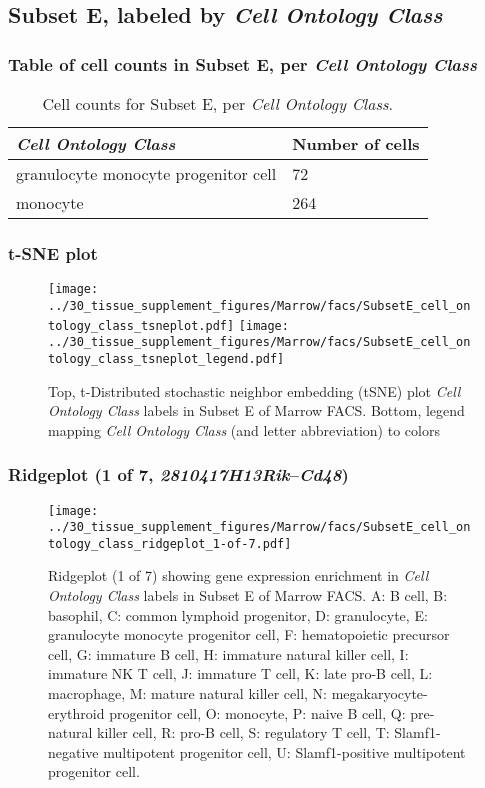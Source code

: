 \clearpage

\subsection{Subset E, labeled by \emph{Cell Ontology Class}}
\subsubsection{Table of cell counts in Subset E, per \emph{Cell Ontology Class}}\begin{table}[h]
\centering
\label{my-label}
\begin{tabular}{@{}ll@{}}
\toprule

\emph{Cell Ontology Class}& Number of cells \\ \midrule
granulocyte monocyte progenitor cell & 72 \\

monocyte & 264 \\
\bottomrule
\end{tabular}
\caption{Cell counts for Subset E, per \emph{Cell Ontology Class}.}
\end{table}

\clearpage
\subsubsection{t-SNE plot}
\begin{figure}[h]
\centering
\texttt{[image: ../30\_tissue\_supplement\_figures/Marrow/facs/SubsetE\_cell\_ontology\_class\_tsneplot.pdf]}
\texttt{[image: ../30\_tissue\_supplement\_figures/Marrow/facs/SubsetE\_cell\_ontology\_class\_tsneplot\_legend.pdf]}
\caption{Top, t-Distributed stochastic neighbor embedding (tSNE) plot  \emph{Cell Ontology Class} labels in Subset E of Marrow FACS. Bottom, legend mapping \emph{Cell Ontology Class} (and letter abbreviation) to colors}
\end{figure}


\clearpage

\subsubsection{Ridgeplot (1 of 7, \emph{2810417H13Rik}--\emph{Cd48})}
\begin{figure}[h]
\centering
\texttt{[image: ../30\_tissue\_supplement\_figures/Marrow/facs/SubsetE\_cell\_ontology\_class\_ridgeplot\_1-of-7.pdf]}

\caption{ Ridgeplot (1 of 7)  showing gene expression enrichment in \emph{Cell Ontology Class} labels in Subset E of Marrow FACS. A: B cell, B: basophil, C: common lymphoid progenitor, D: granulocyte, E: granulocyte monocyte progenitor cell, F: hematopoietic precursor cell, G: immature B cell, H: immature natural killer cell, I: immature NK T cell, J: immature T cell, K: late pro-B cell, L: macrophage, M: mature natural killer cell, N: megakaryocyte-erythroid progenitor cell, O: monocyte, P: naive B cell, Q: pre-natural killer cell, R: pro-B cell, S: regulatory T cell, T: Slamf1-negative multipotent progenitor cell, U: Slamf1-positive multipotent progenitor cell.}
\end{figure}


